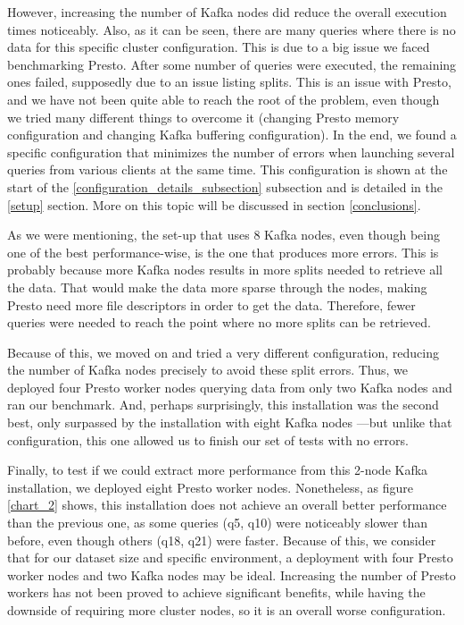 \documentclass[conference]{IEEEtran}
\begin{document}
However, increasing the number of Kafka nodes did reduce the overall execution times noticeably. Also, as it can be seen, there are many queries where there is no data for this specific cluster configuration. This is due to a big issue we faced benchmarking Presto. After some number of queries were executed, the remaining ones failed, supposedly due to an issue listing splits. This is an issue with Presto, and we have not been quite able to reach the root of the problem, even though we tried many different things to overcome it (changing Presto memory configuration and changing Kafka buffering configuration). In the end, we found a specific configuration that minimizes the number of errors when launching several queries from various clients at the same time. This configuration is shown at the start of the \ref{configuration_details_subsection} subsection and is detailed in the \ref{setup} section. More on this topic will be discussed in section \ref{conclusions}.

As we were mentioning, the set-up that uses 8 Kafka nodes, even though being one of the best performance-wise, is the one that produces more errors. This is probably because more Kafka nodes results in more splits needed to retrieve all the data. That would make the data more sparse through the nodes, making Presto need more file descriptors in order to get the data. Therefore, fewer queries were needed to reach the point where no more splits can be retrieved.

Because of this, we moved on and tried a very different configuration, reducing the number of Kafka nodes precisely to avoid these split errors. Thus, we deployed four Presto worker nodes querying data from only two Kafka nodes and ran our benchmark. And, perhaps surprisingly, this installation was the second best, only surpassed by the installation with eight Kafka nodes ---but unlike that configuration, this one allowed us to finish our set of tests with no errors.

Finally, to test if we could extract more performance from this 2-node Kafka installation, we deployed eight Presto worker nodes. Nonetheless, as figure \ref{chart_2} shows, this installation does not achieve an overall better performance than the previous one, as some queries (q5, q10) were noticeably slower than before, even though others (q18, q21) were faster. Because of this, we consider that for our dataset size and specific environment, a deployment with four Presto worker nodes and two Kafka nodes may be ideal. Increasing the number of Presto workers has not been proved to achieve significant benefits, while having the downside of requiring more cluster nodes, so it is an overall worse configuration.
\end{document}
